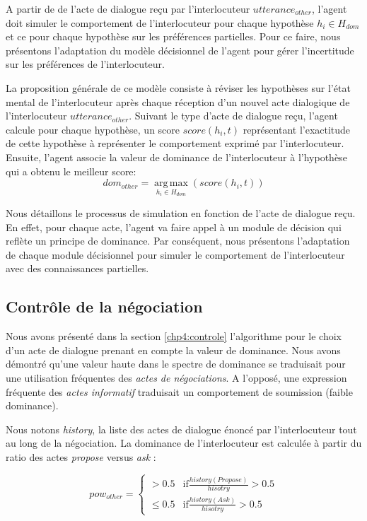 	A partir de de l'acte de dialogue reçu par l'interlocuteur $utterance_{other}$, l'agent doit simuler le comportement de l'interlocuteur pour chaque hypothèse $h_i \in H_{dom}$ et ce pour chaque hypothèse sur les préférences partielles. Pour ce faire, nous présentons l'adaptation du modèle décisionnel de l'agent pour gérer l'incertitude sur les préférences de l'interlocuteur. 
	

	La proposition générale de ce modèle consiste à réviser les hypothèses sur l'état mental de l'interlocuteur après chaque réception d'un nouvel acte dialogique de l'interlocuteur $utterance_{other}$. Suivant le type d'acte de dialogue reçu, l'agent calcule pour chaque hypothèse, un score $score(h_i,t)$ représentant l'exactitude de cette hypothèse à représenter le comportement exprimé par l'interlocuteur. Ensuite, l'agent associe la valeur de dominance de l'interlocuteur à l'hypothèse qui a obtenu le meilleur score:
				\begin{equation}
				dom_{other} = \operatorname*{arg\,max}_{h_i \in H_{dom}} (score(h_i,t))
				\end{equation}
		
	Nous détaillons le processus de simulation en fonction de l'acte de dialogue reçu. En effet, pour chaque acte, l'agent va faire appel à un module de décision qui reflète un principe de dominance. Par conséquent, nous présentons l'adaptation de chaque module décisionnel pour simuler le comportement de l'interlocuteur avec des connaissances partielles. 
	
	\subsection{Contrôle de la négociation}	
	
	Nous avons présenté dans la section \ref{chp4:controle} l'algorithme pour le choix d'un acte de dialogue prenant en compte la valeur de dominance. Nous avons démontré qu'une valeur haute dans le spectre de dominance se traduisait pour une utilisation fréquentes des \emph{actes de négociations}. A l'opposé, une expression fréquente des \emph{actes informatif} traduisait un comportement de soumission (faible dominance). 
	
	Nous notons \textit{history}, la liste des actes de dialogue énoncé par l'interlocuteur tout au long de la négociation. La dominance de l'interlocuteur est calculée à partir du ratio des actes \emph{propose} versus \emph{ask} :
		
		\begin{equation}
		pow_{other} = \left\{\begin{array}{ll}
		> 0.5 & \mathrm{if } \frac{history(Propose)}{hisotry} > 0.5\\
		\leq 0.5 & \mathrm{if  } \frac{history(Ask)}{hisotry} > 0.5
		\end{array}\right.
		\end{equation}
		
